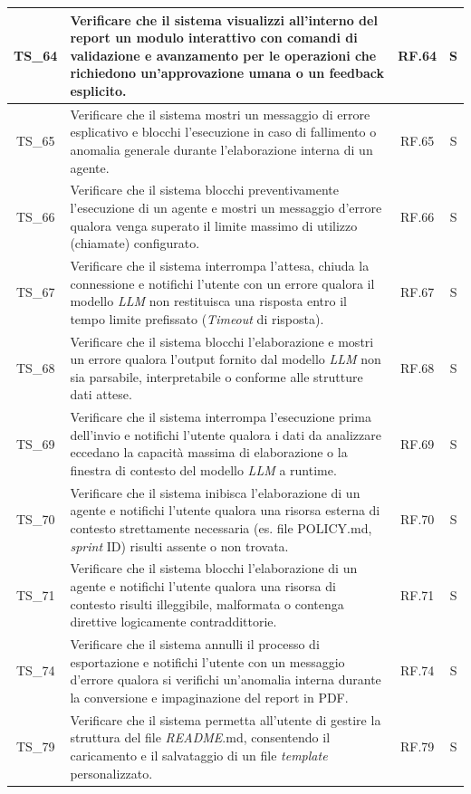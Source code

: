 \documentclass[12pt, a4paper]{article}
\newlength{\LargColVal} %
\begin{document}
\begin{xltabular}{\textwidth}{|c|X|C{\LargColVal}|C{\LargColVal}|}
    TS\_64 & Verificare che il sistema visualizzi all'interno del report un modulo interattivo con comandi di validazione e avanzamento per le operazioni che richiedono un'approvazione umana o un feedback esplicito. & RF.64 & S \\ \hline
    TS\_65 & Verificare che il sistema mostri un messaggio di errore esplicativo e blocchi l'esecuzione in caso di fallimento o anomalia generale durante l'elaborazione interna di un agente. & RF.65 & S \\ \hline
    TS\_66 & Verificare che il sistema blocchi preventivamente l'esecuzione di un agente e mostri un messaggio d'errore qualora venga superato il limite massimo di utilizzo (chiamate) configurato. & RF.66 & S \\ \hline
    TS\_67 & Verificare che il sistema interrompa l'attesa, chiuda la connessione e notifichi l'utente con un errore qualora il modello \textit{LLM} non restituisca una risposta entro il tempo limite prefissato (\textit{Timeout} di risposta). & RF.67 & S \\ \hline
    TS\_68 & Verificare che il sistema blocchi l'elaborazione e mostri un errore qualora l'output fornito dal modello \textit{LLM} non sia parsabile, interpretabile o conforme alle strutture dati attese. & RF.68 & S \\ \hline
    TS\_69 & Verificare che il sistema interrompa l'esecuzione prima dell'invio e notifichi l'utente qualora i dati da analizzare eccedano la capacità massima di elaborazione o la finestra di contesto del modello \textit{LLM} a runtime. & RF.69 & S \\ \hline
    TS\_70 & Verificare che il sistema inibisca l'elaborazione di un agente e notifichi l'utente qualora una risorsa esterna di contesto strettamente necessaria (es. file POLICY.md, \textit{sprint} ID) risulti assente o non trovata. & RF.70 & S \\ \hline
    TS\_71 & Verificare che il sistema blocchi l'elaborazione di un agente e notifichi l'utente qualora una risorsa di contesto risulti illeggibile, malformata o contenga direttive logicamente contraddittorie. & RF.71 & S \\ \hline
    TS\_74 & Verificare che il sistema annulli il processo di esportazione e notifichi l'utente con un messaggio d'errore qualora si verifichi un'anomalia interna durante la conversione e impaginazione del report in PDF. & RF.74 & S \\ \hline
    TS\_79 & Verificare che il sistema permetta all'utente di gestire la struttura del file \textit{README}.md, consentendo il caricamento e il salvataggio di un file \textit{template} personalizzato. & RF.79 & S \\ \hline

\end{xltabular}
\end{document}
